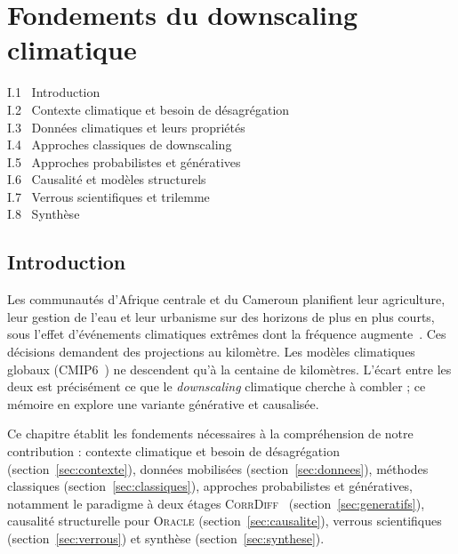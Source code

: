 \documentclass[14pt,a4paper,openany]{extreport}
\newcommand{\Oracle}{\textsc{Oracle}}
\newcommand{\CorrDiff}{\textsc{CorrDiff}}
\begin{document}
\chapter{Fondements du downscaling climatique}
\label{chap:fondements}

\begin{sommairebox}
\small
\noindent I.1 \ Introduction \dotfill \pageref{sec:intro}\\
\noindent I.2 \ Contexte climatique et besoin de désagrégation \dotfill \pageref{sec:contexte}\\
\noindent I.3 \ Données climatiques et leurs propriétés \dotfill \pageref{sec:donnees}\\
\noindent I.4 \ Approches classiques de downscaling \dotfill \pageref{sec:classiques}\\
\noindent I.5 \ Approches probabilistes et génératives \dotfill \pageref{sec:generatifs}\\
\noindent I.6 \ Causalité et modèles structurels \dotfill \pageref{sec:causalite}\\
\noindent I.7 \ Verrous scientifiques et trilemme \dotfill \pageref{sec:verrous}\\
\noindent I.8 \ Synthèse \dotfill \pageref{sec:synthese}
\end{sommairebox}

\vspace{1.5em}

\section{Introduction}
\label{sec:intro}

Les communautés d'Afrique centrale et du Cameroun planifient leur agriculture, leur gestion de l'eau et leur urbanisme sur des horizons de plus en plus courts, sous l'effet d'événements climatiques extrêmes dont la fréquence augmente~\cite{ipcc_ar6_2021}. Ces décisions demandent des projections au kilomètre. Les modèles climatiques globaux (CMIP6~\cite{eyring_cmip6_2016}) ne descendent qu'à la centaine de kilomètres. L'écart entre les deux est précisément ce que le \emph{downscaling} climatique cherche à combler ; ce mémoire en explore une variante générative et causalisée.

Ce chapitre établit les fondements nécessaires à la compréhension de notre contribution : contexte climatique et besoin de désagrégation (section~\ref{sec:contexte}), données mobilisées (section~\ref{sec:donnees}), méthodes classiques (section~\ref{sec:classiques}), approches probabilistes et génératives, notamment le paradigme à deux étages \CorrDiff{}~\cite{mardani_corrdiff_2023} (section~\ref{sec:generatifs}), causalité structurelle pour \Oracle{} (section~\ref{sec:causalite}), verrous scientifiques (section~\ref{sec:verrous}) et synthèse (section~\ref{sec:synthese}).
\end{document}

